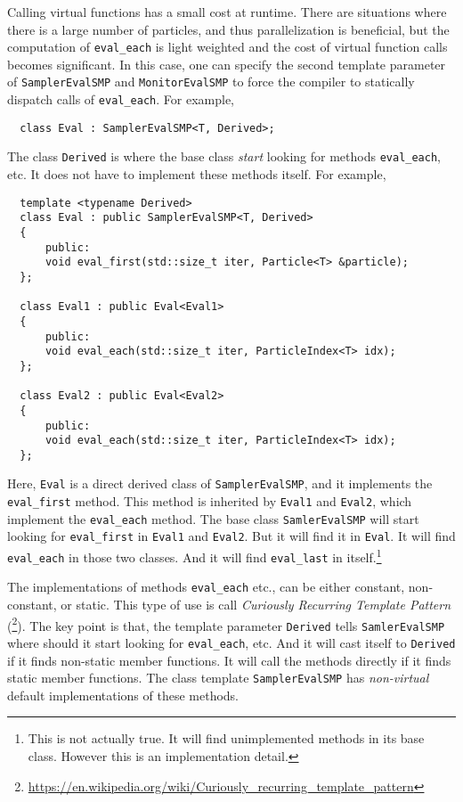 Calling virtual functions has a small cost at runtime. There are situations
where there is a large number of particles, and thus parallelization is
beneficial, but the computation of \verb|eval_each| is light weighted and the
cost of virtual function calls becomes significant. In this case, one can
specify the second template parameter of \verb|SamplerEvalSMP| and
\verb|MonitorEvalSMP| to force the compiler to statically dispatch calls of
\verb|eval_each|. For example,
\begin{Verbatim}
  class Eval : SamplerEvalSMP<T, Derived>;
\end{Verbatim}
The class \verb|Derived| is where the base class \emph{start} looking for
methods \verb|eval_each|, etc. It does not have to implement these methods
itself. For example,
\begin{Verbatim}
  template <typename Derived>
  class Eval : public SamplerEvalSMP<T, Derived>
  {
      public:
      void eval_first(std::size_t iter, Particle<T> &particle);
  };

  class Eval1 : public Eval<Eval1>
  {
      public:
      void eval_each(std::size_t iter, ParticleIndex<T> idx);
  };

  class Eval2 : public Eval<Eval2>
  {
      public:
      void eval_each(std::size_t iter, ParticleIndex<T> idx);
  };
\end{Verbatim}
Here, \verb|Eval| is a direct derived class of \verb|SamplerEvalSMP|, and it
implements the \verb|eval_first| method. This method is inherited by
\verb|Eval1| and \verb|Eval2|, which implement the \verb|eval_each| method. The
base class \verb|SamlerEvalSMP| will start looking for \verb|eval_first| in
\verb|Eval1| and \verb|Eval2|. But it will find it in \verb|Eval|. It will
find \verb|eval_each| in those two classes. And it will find \verb|eval_last|
in itself.\footnote{This is not actually true. It will find unimplemented
  methods in its base class. However this is an implementation detail.}

The implementations of methods \verb|eval_each| etc., can be either constant,
non-constant, or static. This type of use is call \emph{Curiously Recurring
  Template Pattern} (\crtp\footnote{%
  \url{https://en.wikipedia.org/wiki/Curiously_recurring_template_pattern}}).
The key point is that, the template parameter \verb|Derived| tells
\verb|SamlerEvalSMP| where should it start looking for \verb|eval_each|, etc.
And it will cast itself to \verb|Derived| if it finds non-static member
functions. It will call the methods directly if it finds static member
functions. The class template \verb|SamplerEvalSMP| has \emph{non-virtual}
default implementations of these methods.

